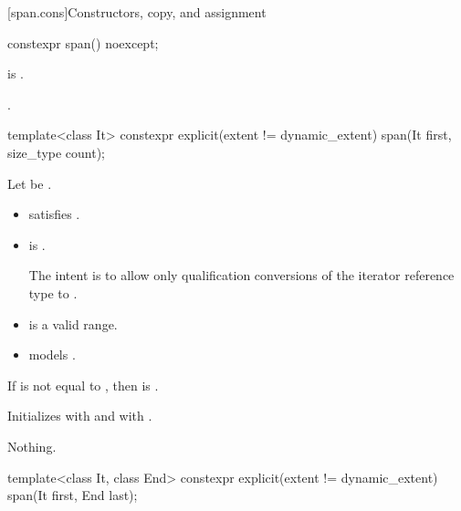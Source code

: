 [span.cons]{Constructors, copy, and assignment}

%
\begin{itemdecl}
constexpr span() noexcept;
\end{itemdecl}

\begin{itemdescr}
\pnum
\constraints
{} is .

\pnum
\ensures
.
\end{itemdescr}

%
\begin{itemdecl}
template<class It>
  constexpr explicit(extent != dynamic_extent) span(It first, size_type count);
\end{itemdecl}

\begin{itemdescr}
\pnum
\constraints
Let  be .
\begin{itemize}
\item {} satisfies .
\item
{} is .
\begin{note}
The intent is to allow only qualification conversions
of the iterator reference type to .
\end{note}
\end{itemize}

\pnum
\expects
\begin{itemize}
\item {} is a valid range.
\item {} models .
\end{itemize}

\pnum
\hardexpects
If  is not equal to ,
then  is .

\pnum
\effects
Initializes  with  and
 with .

\pnum
\throws
Nothing.
\end{itemdescr}

%
\begin{itemdecl}
template<class It, class End>
  constexpr explicit(extent != dynamic_extent) span(It first, End last);
\end{itemdecl}

